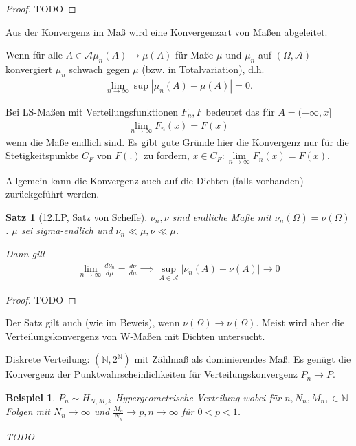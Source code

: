 \documentclass[]{article}
\newtheorem{theorem}{Satz}
\newtheorem*{example}{Beispiel}
\begin{document}
\begin{proof}
	TODO
\end{proof}

Aus der Konvergenz im Maß wird eine Konvergenzart von Maßen abgeleitet.

Wenn für alle $A \in \mathcal{A} \mu_n(A) \rightarrow \mu(A)$ für Maße $\mu$ und $\mu_n$ auf $(\Omega, \mathcal{A})$ konvergiert $\mu_n$ schwach gegen $\mu$ (bzw. in Totalvariation), d.h.
\begin{align*}
	\lim\limits_{n\rightarrow\infty} \sup |\mu_n(A) - \mu(A)| = 0.
\end{align*}

Bei LS-Maßen mit Verteilungsfunktionen $F_n,F$ bedeutet das für $A=(-\infty, x]$
\begin{align*}
	\lim\limits_{n\rightarrow\infty}F_n(x) = F(x)
\end{align*}
wenn die Maße endlich sind. Es gibt gute Gründe hier die Konvergenz nur für die Stetigkeitspunkte $C_F$ von $F(.)$ zu fordern, $x \in C_F : \lim\limits_{n\rightarrow\infty}F_n(x)=F(x)$.

Allgemein kann die Konvergenz auch auf die Dichten (falls vorhanden) zurückgeführt werden.

\begin{theorem}[12.LP, Satz von Scheffe]
	$\nu_n, \nu$ sind endliche Maße mit $\nu_n(\Omega) = \nu(\Omega)$. $\mu$ sei sigma-endlich und $\nu_n \ll \mu, \nu \ll \mu$.
	
	Dann gilt
	\begin{align*}
		\lim\limits_{n\rightarrow\infty} \frac{d\nu_n}{d\mu} = \frac{d\nu}{d\mu} \implies \sup_{A\in \mathcal{A}} |\nu_n(A)-\nu(A)| \rightarrow 0
	\end{align*}
\end{theorem}

\begin{proof}
	TODO
\end{proof}

Der Satz gilt auch (wie im Beweis), wenn $\nu(\Omega)\rightarrow\nu(\Omega)$. Meist wird aber die Verteilungskonvergenz von W-Maßen mit Dichten untersucht.

Diskrete Verteilung: $(\mathbb{N}, 2^\mathbb{N})$ mit Zählmaß als dominierendes Maß. Es genügt die Konvergenz der Punktwahrscheinlichkeiten für Verteilungskonvergenz $P_n \rightarrow P$.

\begin{example}
	$P_n \sim H_{N,M,k}$ Hypergeometrische Verteilung wobei für $n, N_n, M_n, \in \mathbb{N}$ Folgen mit $N_n \rightarrow \infty$ und $\frac{M_n}{N_n} \rightarrow p, n\rightarrow\infty$ für $0 < p < 1$.
	
	TODO
\end{example}
\end{document}
